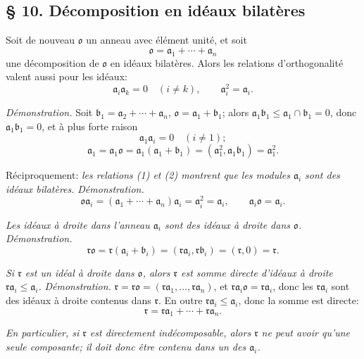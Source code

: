
\providecommand{\mo}{\mathfrak{o}}
\providecommand{\ma}{\mathfrak{a}}
\providecommand{\mb}{\mathfrak{b}}
\providecommand{\mc}{\mathfrak{c}}
\providecommand{\mr}{\mathfrak{r}}

\subsection*{\S{} 10. Décomposition en idéaux bilatères}

Soit de nouveau $\mo$ un anneau avec élément unité, et soit
\begin{equation}
        \mo=\ma_1+\cdots+\ma_n                                  \tag{1}
\end{equation}
une décomposition de $\mo$ en idéaux bilatères. Alors les relations d'orthogonalité valent aussi pour les idéaux:
\begin{equation}
        \ma_i\ma_k=0\quad(i\ne k),
        \qquad
        \ma_i^2=\ma_i.                                             \tag{2}
\end{equation}

\emph{Démonstration.} Soit $\mb_1=\ma_2+\cdots+\ma_n$, $\mo=\ma_1+\mb_1$; alors $\ma_1\mb_1\leq \ma_1\cap\mb_1=0$, donc $\ma_1\mb_1=0$, et à plus forte raison
\[
        \ma_1\ma_i=0\quad(i\ne1);
\]
\[
        \ma_1=\ma_1\mo=\ma_1(\ma_1+\mb_1)=(\ma_1^2,\ma_1\mb_1)=\ma_1^2.
\]

Réciproquement: \emph{les relations (1) et (2) montrent que les modules $\ma_i$ sont des idéaux bilatères.}
\emph{Démonstration.}
\[
        \mo\ma_i=(\ma_1+\cdots+\ma_n)\ma_i=\ma_i^2=\ma_i,
        \qquad
        \ma_i\mo=\ma_i.
\]

\emph{Les idéaux à droite dans l'anneau $\ma_i$ sont des idéaux à droite dans $\mo$.}
\emph{Démonstration.}
\[
        \mr\mo=\mr(\ma_i+\mb_i)=(\mr\ma_i,\mr\mb_i)=(\mr,0)=\mr.
\]

\emph{Si $\mr$ est un idéal à droite dans $\mo$, alors $\mr$ est somme directe d'idéaux à droite $\mr\ma_i\leq\ma_i$.}
\emph{Démonstration.} $\mr=\mr\mo=(\mr\ma_1,\ldots,\mr\ma_n)$, et $\mr\ma_i\mo=\mr\ma_i$, donc les $\mr\ma_i$ sont des idéaux à droite contenus dans $\mr$. En outre $\mr\ma_i\leq\ma_i$, donc la somme est directe:
\[
        \mr=\mr\ma_1+\cdots+\mr\ma_n.
\]

\emph{En particulier, si $\mr$ est directement indécomposable, alors $\mr$ ne peut avoir qu'une seule composante; il doit donc être contenu dans un des $\ma_i$.}


